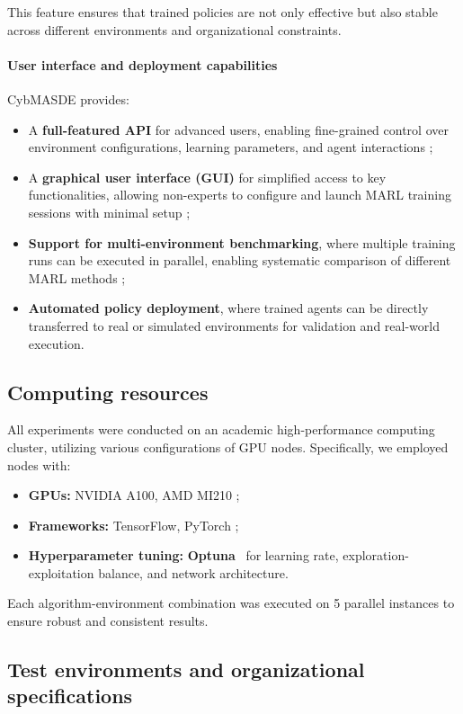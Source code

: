 \documentclass[pdflatex,sn-mathphys-num]{sn-jnl}%
\theoremstyle{thmstyleone}%
\theoremstyle{thmstyletwo}%
\theoremstyle{thmstylethree}%
\begin{document}
This feature ensures that trained policies are not only effective but also stable across different environments and organizational constraints.

\paragraph{User interface and deployment capabilities}
CybMASDE provides:
\begin{itemize}
    \item A \textbf{full-featured API} for advanced users, enabling fine-grained control over environment configurations, learning parameters, and agent interactions ;
    \item A \textbf{graphical user interface (GUI)} for simplified access to key functionalities, allowing non-experts to configure and launch MARL training sessions with minimal setup ;
    \item \textbf{Support for multi-environment benchmarking}, where multiple training runs can be executed in parallel, enabling systematic comparison of different MARL methods ;
    \item \textbf{Automated policy deployment}, where trained agents can be directly transferred to real or simulated environments for validation and real-world execution.
\end{itemize}


\subsection{Computing resources}

All experiments were conducted on an academic high-performance computing cluster, utilizing various configurations of GPU nodes. Specifically, we employed nodes with:
\begin{itemize}
    \item \textbf{GPUs:} NVIDIA A100, AMD MI210 ;
    \item \textbf{Frameworks:} TensorFlow, PyTorch ;
    \item \textbf{Hyperparameter tuning:} \textbf{Optuna}~\cite{akiba2019optuna} for learning rate, exploration-exploitation balance, and network architecture.
\end{itemize}

Each algorithm-environment combination was executed on 5 parallel instances to ensure robust and consistent results.

\subsection{Test environments and organizational specifications}
\end{document}
